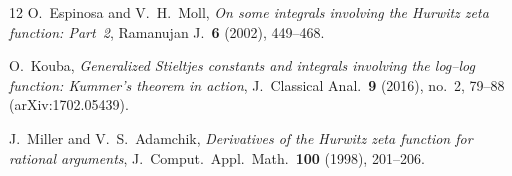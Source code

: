 \documentclass[11pt]{article}
\theoremstyle{remark}
\begin{document}
\begin{thebibliography}{12}
O.~Espinosa and V.~H.~Moll, \emph{On some integrals involving the Hurwitz
zeta function: Part~2}, Ramanujan J.\ \textbf{6} (2002), 449--468.

O.~Kouba, \emph{Generalized Stieltjes constants and integrals involving the
log--log function: Kummer's theorem in action}, J.~Classical Anal.\
\textbf{9} (2016), no.~2, 79--88 (arXiv:1702.05439).

J.~Miller and V.~S.~Adamchik, \emph{Derivatives of the Hurwitz zeta
function for rational arguments}, J.~Comput.\ Appl.\ Math.\ \textbf{100}
(1998), 201--206.

\end{thebibliography}
\end{document}
